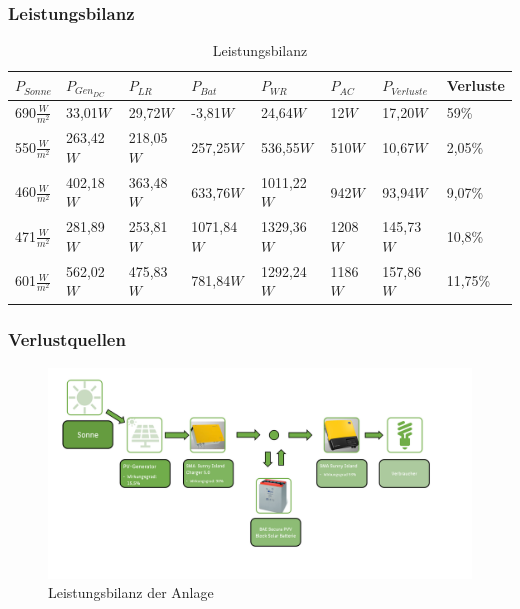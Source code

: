 \subsubsection{Leistungsbilanz}
\begin{table}[!ht]
\centering
\caption{Leistungsbilanz}
\renewcommand{\arraystretch}{1.5}
\begin{tabularx}{\textwidth}{|X|X|X|X|X|X|X|X|}
\hline
\rowcolor[HTML]{76B900} 
$P_{Sonne}$ & $P_{Gen_{DC}}$ & $P_{LR}$ & $P_{Bat}$ & $P_{WR}$ & $P_{AC}$ & $P_{Verluste}$ & Verluste \\ \hline
690$\frac{W}{m^2}$                              &  33,01$W$                & 29,72$W$          &   -3,81$W$            &   24,64$W$          & 12$W$              & 17,20$W$                  & 59\%    \\ \hline
550$\frac{W}{m^2}$                              & 263,42$W$               & 218,05$W$          &  257,25$W$           &  536,55$W$          & 510$W$             & 10,67$W$                  & 2,05\%    \\ \hline
460$\frac{W}{m^2}$                              & 402,18$W$               & 363,48$W$          &  633,76$W$           & 1011,22$W$         & 942$W$             & 93,94$W$                  & 9,07\%    \\ \hline
471$\frac{W}{m^2}$                              & 281,89$W$               & 253,81$W$         & 1071,84$W$          & 1329,36$W$         & 1208$W$            & 145,73$W$                 & 10,8\%    \\ \hline
601$\frac{W}{m^2}$                              & 562,02$W$                & 475,83$W$         &  781,84$W$           & 1292,24$W$         & 1186$W$            & 157,86$W$                  & 11,75\%    \\ \hline
\end{tabularx}
\label{tab:230514_Leistungsbilanz}
\end{table}



\subsubsection{Verlustquellen}
\begin{figure}[!ht]
		\centering
		\includegraphics[width=\linewidth]{Abbildungen/Leistungsbilanz.png}
		\caption{Leistungsbilanz der Anlage}
		\label{fig:230512_Leistungsbilanz}
\end{figure}

